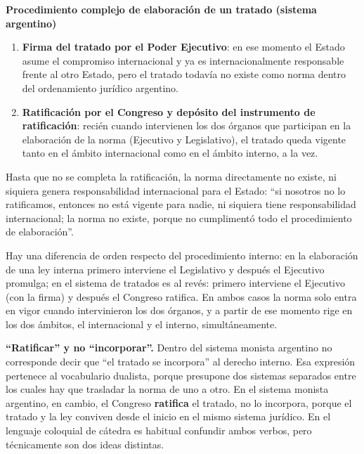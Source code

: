 \documentclass[12pt,oneside]{book}
\begin{document}
\begin{important}
\textbf{Procedimiento complejo de elaboración de un tratado (sistema argentino)}
\begin{enumerate}
    \item \textbf{Firma del tratado por el Poder Ejecutivo}: en ese momento el Estado asume el compromiso internacional y ya es internacionalmente responsable frente al otro Estado, pero el tratado todavía no existe como norma dentro del ordenamiento jurídico argentino.
    \item \textbf{Ratificación por el Congreso y depósito del instrumento de ratificación}: recién cuando intervienen los dos órganos que participan en la elaboración de la norma (Ejecutivo y Legislativo), el tratado queda vigente tanto en el ámbito internacional como en el ámbito interno, a la vez.
\end{enumerate}
\end{important}

Hasta que no se completa la ratificación, la norma directamente no existe, ni siquiera genera responsabilidad internacional para el Estado: “si nosotros no lo ratificamos, entonces no está vigente para nadie, ni siquiera tiene responsabilidad internacional; la norma no existe, porque no cumplimentó todo el procedimiento de elaboración”.

Hay una diferencia de orden respecto del procedimiento interno: en la elaboración de una ley interna primero interviene el Legislativo y después el Ejecutivo promulga; en el sistema de tratados es al revés: primero interviene el Ejecutivo (con la firma) y después el Congreso ratifica. En ambos casos la norma solo entra en vigor cuando intervinieron los dos órganos, y a partir de ese momento rige en los dos ámbitos, el internacional y el interno, simultáneamente.

\begin{important}
\textbf{“Ratificar” y no “incorporar”.} Dentro del sistema monista argentino no corresponde decir que “el tratado se incorpora” al derecho interno. Esa expresión pertenece al vocabulario dualista, porque presupone dos sistemas separados entre los cuales hay que trasladar la norma de uno a otro. En el sistema monista argentino, en cambio, el Congreso \textbf{ratifica} el tratado, no lo incorpora, porque el tratado y la ley conviven desde el inicio en el mismo sistema jurídico. En el lenguaje coloquial de cátedra es habitual confundir ambos verbos, pero técnicamente son dos ideas distintas.
\end{important}
\end{document}
